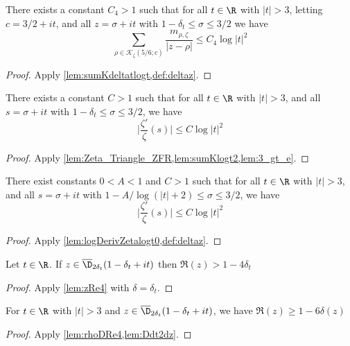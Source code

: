 \begin{lemma} \label{lem:sumKlogt2}  \leanok
There exists a constant $C_4>1$ such that for all $t\in\R$ with $|t|>3$, letting $c=3/2+it$, and all $z=\sigma+it$ with $1-\delta_t \le \sigma \le 3/2$ we have
\[\sum_{\rho\in\mathcal K_{\zeta}(5/6;c)} \frac{m_{\rho,\zeta}}{|z-\rho|} \le C_4\log|t|^2\]
\end{lemma}
\begin{proof}
\leanok
Apply \cref{lem:sumKdeltatlogt,def:deltaz}.
\end{proof}

\begin{lemma} \label{lem:logDerivZetalogt0}  \leanok
There exists a constant $C>1$ such that for all $t\in\R$ with $|t|>3$, and all $s=\sigma+it$ with $1-\delta_t \le \sigma \le 3/2$, we have
\[ \Big|\frac{\zeta'}{\zeta}(s)\Big| \le C\log|t|^2\]
\end{lemma}
\begin{proof}
\leanok
Apply \cref{lem:Zeta_Triangle_ZFR,lem:sumKlogt2,lem:3_gt_e}.
\end{proof}

\begin{lemma} \label{lem:logDerivZetalogt2}  \leanok
There exist constants $0<A<1$ and $C>1$ such that for all $t\in\R$ with $|t|>3$, and all $s=\sigma+it$ with $1 - A/\log(|t|+2) \le \sigma \le 3/2$, we have
\[ \Big|\frac{\zeta'}{\zeta}(s)\Big| \le C\log|t|^2\]
\end{lemma}
\begin{proof}
\leanok
{}
Apply \cref{lem:logDerivZetalogt0,def:deltaz}.
\end{proof}


\begin{lemma}\label{lem:rhoDRe4}  \leanok
Let $t\in\R$. If $z\in \overline{\D}_{2\delta_t}(1-\delta_t+it)$ then $\Re(z) > 1-4\delta_t$
\end{lemma}
\begin{proof}
\leanok
Apply \cref{lem:zRe4} with $\delta=\delta_t$.
\end{proof}

\begin{lemma} \label{lem:DRez6dz}  \leanok
For $t\in \R$ with $|t|>3$ and $z\in \overline{\D}_{2\delta_t}(1-\delta_t+it)$, we have $\Re(z) \ge 1 - 6\delta(z)$
\end{lemma}
\begin{proof}
\leanok
Apply \cref{lem:rhoDRe4,lem:Ddt2dz}.
\end{proof}

